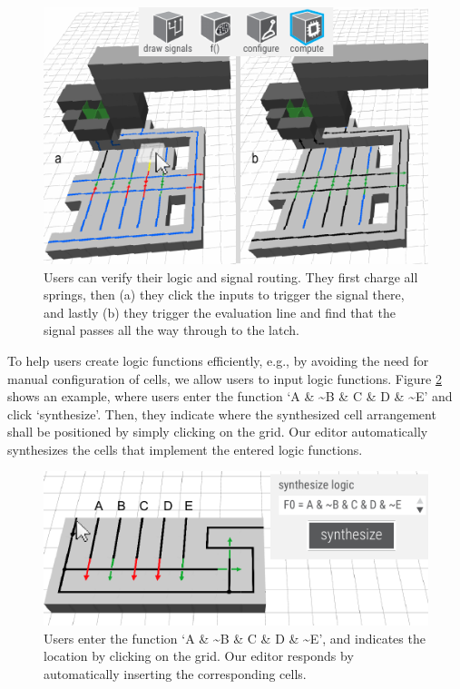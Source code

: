 \begin{figure} [h]
    \includegraphics[width=\textwidth]{chapters/digital-metamaterials-FIG/29-editor-verify-signals.pdf}
    \caption[Short figure name.]{Users can verify their logic and signal routing. They first charge all springs, then (a) they click the inputs to trigger the signal there, and lastly (b) they trigger the evaluation line and find that the signal passes all the way through to the latch.
    \label{fig:29-editor-verify-signals}}
\end{figure}

To help users create logic functions efficiently, e.g., by avoiding the need for manual configuration of cells, we allow users to input logic functions. Figure \ref{fig:30-editor-synthesize-cells} shows an example, where users enter the function `A \& {\textasciitilde}B \& C \& D \& {\textasciitilde}E' and click ‘synthesize’. Then, they indicate where the synthesized cell arrangement shall be positioned by simply clicking on the grid. Our editor automatically synthesizes the cells that implement the entered logic functions. 

\begin{figure} [h]
    \includegraphics[width=\textwidth]{chapters/digital-metamaterials-FIG/30-editor-synthesize-cells.pdf}
    \caption[Short figure name.]{Users enter the function `A \& {\textasciitilde}B \& C \& D \& {\textasciitilde}E', and indicates the location by clicking on the grid. Our editor responds by automatically inserting the corresponding cells.
    \label{fig:30-editor-synthesize-cells}}
\end{figure}


